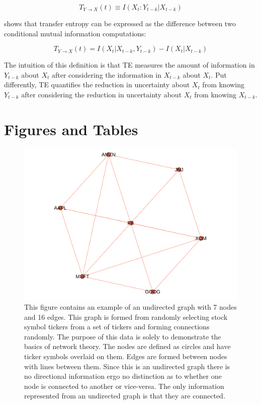 \begin{equation}
T_{Y \rightarrow X} (t) \equiv I(X_t: Y_{t-k} |  X_{t-k})
\end{equation}

\noindent \cite{kraskovEstimator} shows that transfer entropy can be expressed as the difference between two conditional mutual information computations: 

\begin{equation}  \label{eq:TE-MI-Diff}
T_{Y \rightarrow X}(t) = I(X_t | X_{t-k}, Y_{t-k}) -  I(X_t | X_{t-k}) 
 \end{equation} 

The intuition of this definition is that TE measures the amount of information in \(Y_{t-k}\) about \(X_t\) after  considering the information in \(X_{t-k}\) about \(X_t\). Put differently, TE quantifies the reduction in uncertainty about \(X_t\) from knowing \(Y_{t-k}\) after considering the reduction in uncertainty about \(X_t\) from knowing \(X_{t-k}\).

\clearpage

\section{Figures and Tables}


\begin{figure}[!htb]
    \centering
      \centering
      \includegraphics[width=\textwidth]{figures/Intro/ExampleNetwork.pdf}

      \caption{
      This figure contains an example of an undirected graph with 7 nodes and 16 edges. This graph is formed from randomly selecting stock symbol tickers from a set of tickers and forming connections randomly. The purpose of this data is solely to demonstrate the basics of network theory. The nodes are defined as circles and have ticker symbols overlaid on them. Edges are formed between nodes with lines between them.  Since this is an undirected graph there is no directional information ergo no distinction as to whether one node is connected to another or vice-versa.  The only information represented from an undirected graph is that they are connected.  
      }
      \label{fig:IntroExampleNetwork}

  \end{figure}

